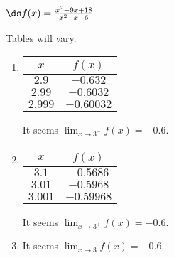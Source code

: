 {$\ds f(x)=\frac{x^2-9 x+18}{x^2-x-6}$
}
{Tables will vary.
\begin{enumerate}
\item	
\begin{tabular}{cc}
$x$ & $f(x)$ \\ \hline
$2.9$ & $-0.632$ \\
 $2.99$ & $-0.6032$ \\
 $2.999$ & $-0.60032$ \\
  \end{tabular}
 It seems $\lim_{x\to3^-}f(x) =-0.6$.
\item
\begin{tabular}{cc}
$x$ & $f(x)$ \\ \hline
$ 3.1$ & $-0.5686$ \\
 $3.01$ & $-0.5968$ \\
 $3.001$ & $-0.59968$ \\
  \end{tabular}
  It seems $\lim_{x\to3^+}f(x) =-0.6$.
\item		It seems $\lim_{x\to3}f(x) =-0.6$.
\end{enumerate}
}
